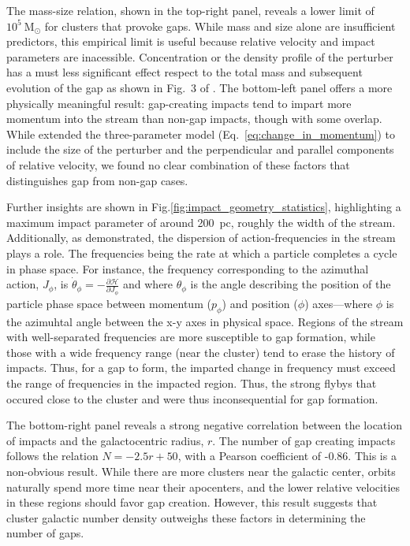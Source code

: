 \documentclass[draft]{aa}
\begin{document}
    The mass-size relation, shown in the top-right panel, reveals a lower limit of $10^5~\textrm{M}_{\odot}$ for clusters that provoke gaps. While mass and size alone are insufficient predictors, this empirical limit is useful because relative velocity and impact parameters are inacessible. Concentration or the density profile of the perturber has a must less significant effect respect to the total mass and subsequent evolution of the gap as shown in Fig.~3 of \citet{2016MNRAS.457.3817S}. The bottom-left panel offers a more physically meaningful result: gap-creating impacts tend to impart more momentum into the stream than non-gap impacts, though with some overlap. While \citet{2015MNRAS.450.1136E} extended the three-parameter model (Eq.~\ref{eq:change_in_momentum}) to include the size of the perturber and the perpendicular and parallel components of relative velocity, we found no clear combination of these factors that distinguishes gap from non-gap cases.
    
    Further insights are shown in Fig.\ref{fig:impact_geometry_statistics}, highlighting a maximum impact parameter of around 200~pc, roughly the width of the stream. Additionally, as \citet{2016MNRAS.457.3817S} demonstrated, the dispersion of action-frequencies in the stream plays a role. The frequencies being the rate at which a particle completes a cycle in phase space. For instance, the frequency corresponding to the azimuthal action, $J_\phi$, is $\dot\theta_\phi = - \frac{\mathcal{\partial H}}{\partial J_\phi}$ and where $\theta_\phi$ is the angle describing the position of the particle phase space between momentum ($p_\phi$) and position ($\phi$) axes---where $\phi$ is the azimuhtal angle between the x-y axes in physical space. Regions of the stream with well-separated frequencies are more susceptible to gap formation, while those with a wide frequency range (near the cluster) tend to erase the history of impacts. Thus, for a gap to form, the imparted change in frequency must exceed the range of frequencies in the impacted region. Thus, the strong flybys that occured close to the cluster and were thus inconsequential for gap formation.


    The bottom-right panel reveals a strong negative correlation between the location of impacts and the galactocentric radius, $r$. The number of gap creating impacts follows the relation $N = -2.5r + 50$, with a Pearson coefficient of -0.86. This is a non-obvious result. While there are more clusters near the galactic center, orbits naturally spend more time near their apocenters, and the lower relative velocities in these regions should favor gap creation. However, this result suggests that cluster galactic number density outweighs these factors in determining the number of gaps.
\end{document}
